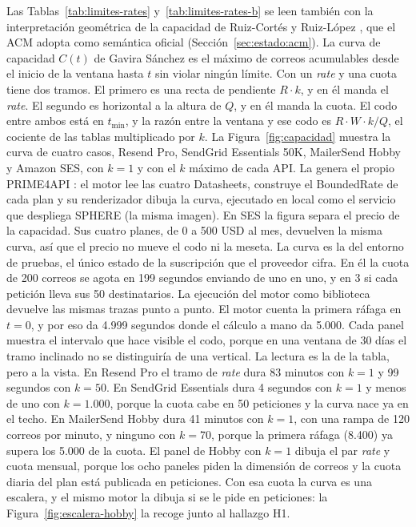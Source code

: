 Las Tablas~\ref{tab:limites-rates} y~\ref{tab:limites-rates-b} se leen también con la interpretación geométrica de la capacidad de Ruiz-Cortés y Ruiz-López \citep{ruizcortes2025cajanegra}, que el ACM adopta como semántica oficial (Sección~\ref{sec:estado:acm}).
La curva de capacidad $C(t)$ de Gavira Sánchez \citep{gavira2026tfm} es el máximo de correos acumulables desde el inicio de la ventana hasta $t$ sin violar ningún límite.
Con un \textit{rate} y una cuota tiene dos tramos.
El primero es una recta de pendiente $R \cdot k$, y en él manda el \textit{rate}.
El segundo es horizontal a la altura de $Q$, y en él manda la cuota.
El codo entre ambos está en $t_{\min}$, y la razón entre la ventana y ese codo es $R \cdot W \cdot k / Q$, el cociente de las tablas multiplicado por $k$.
La Figura~\ref{fig:capacidad} muestra la curva de cuatro casos, Resend Pro, SendGrid Essentials 50K, MailerSend Hobby y Amazon SES, con $k = 1$ y con el $k$ máximo de cada API.
La genera el propio PRIME4API \citep{prime4apirepo}: el motor lee las cuatro Datasheets, construye el BoundedRate de cada plan y su renderizador dibuja la curva, ejecutado en local como el servicio que despliega SPHERE (la misma imagen).
En SES la figura separa el precio de la capacidad.
Sus cuatro planes, de 0 a 500 USD al mes, devuelven la misma curva, así que el precio no mueve el codo ni la meseta.
La curva es la del entorno de pruebas, el único estado de la suscripción que el proveedor cifra. En él la cuota de 200 correos se agota en 199 segundos enviando de uno en uno, y en 3 si cada petición lleva sus 50 destinatarios.
La ejecución del motor como biblioteca devuelve las mismas trazas punto a punto.
El motor cuenta la primera ráfaga en $t = 0$, y por eso da 4.999 segundos donde el cálculo a mano da 5.000.
Cada panel muestra el intervalo que hace visible el codo, porque en una ventana de 30 días el tramo inclinado no se distinguiría de una vertical.
La lectura es la de la tabla, pero a la vista.
En Resend Pro el tramo de \textit{rate} dura 83 minutos con $k = 1$ y 99 segundos con $k = 50$.
En SendGrid Essentials dura 4 segundos con $k = 1$ y menos de uno con $k = 1.000$, porque la cuota cabe en 50 peticiones y la curva nace ya en el techo.
En MailerSend Hobby dura 41 minutos con $k = 1$, con una rampa de 120 correos por minuto, y ninguno con $k = 70$, porque la primera ráfaga (8.400) ya supera los 5.000 de la cuota.
El panel de Hobby con $k = 1$ dibuja el par \textit{rate} y cuota mensual, porque los ocho paneles piden la dimensión de correos y la cuota diaria del plan está publicada en peticiones.
Con esa cuota la curva es una escalera, y el mismo motor la dibuja si se le pide en peticiones: la Figura~\ref{fig:escalera-hobby} la recoge junto al hallazgo H1.
